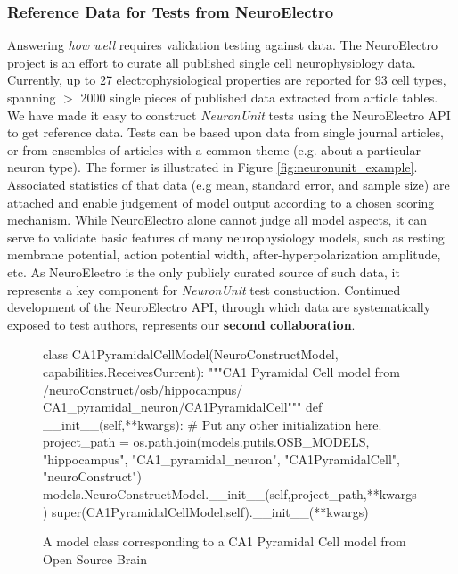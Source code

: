 \documentclass[11pt,letterpaper]{article}
\begin{document}
\subsubsection{Reference Data for Tests from NeuroElectro}
Answering \textit{how well} requires validation testing against data. The NeuroElectro project\cite{neuroelectro_url} is an effort to curate all published single cell neurophysiology data\cite{tripathy_neuroelectro:_2012}.  Currently, up to 27 electrophysiological properties are reported for 93 cell types, spanning $>$ 2000 single pieces of published data extracted from article tables.  We have made it easy to construct \textit{NeuronUnit} tests using the NeuroElectro API to get reference data. Tests can be based upon data from single journal articles, or from ensembles of articles with a common theme (e.g. about a particular neuron type).  The former is illustrated in Figure \ref{fig:neuronunit_example}.  Associated statistics of that data (e.g mean, standard error, and sample size) are attached and enable judgement of model output according to a chosen scoring mechanism. While NeuroElectro alone cannot judge all model aspects, it can serve to validate basic features of many neurophysiology models, such as resting membrane potential, action potential width, after-hyperpolarization amplitude, etc.  As NeuroElectro is the only publicly curated source of such data, it represents a key component for \textit{NeuronUnit} test constuction.  Continued development of the NeuroElectro API, through which data are systematically exposed to test authors, represents our \textbf{second collaboration}\cite{neuroelectro_dev_url}.  

\begin{figure}
\begin{python}
class CA1PyramidalCellModel(NeuroConstructModel,
				            capabilities.ReceivesCurrent):
	"""CA1 Pyramidal Cell model from /neuroConstruct/osb/hippocampus/
	CA1_pyramidal_neuron/CA1PyramidalCell"""
	def __init__(self,**kwargs):
		# Put any other initialization here.
		project_path = os.path.join(models.putils.OSB_MODELS,
									"hippocampus",
									"CA1_pyramidal_neuron",
									"CA1PyramidalCell",
									"neuroConstruct")
		models.NeuroConstructModel.__init__(self,project_path,**kwargs)
		super(CA1PyramidalCellModel,self).__init__(**kwargs)
\end{python}
\vspace{-5px}
\caption{A model class corresponding to a CA1 Pyramidal Cell model from Open Source Brain}
\label{fig:ca1_model}
\vspace{-15px}
\end{figure}
\end{document}
